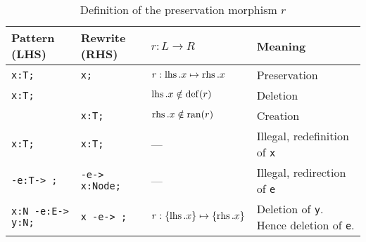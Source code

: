 \begin{table}[htbp]
\centering
\begin{tabularx}{\linewidth}{lllX}
  \textbf{Pattern (LHS)} & \textbf{Rewrite (RHS)} & \textbf{$r: L \longrightarrow R$} & \textbf{Meaning} \\ \hline
  \texttt{x:T;} & \texttt{x;}                 & $r:\operatorname{lhs}.x \mapsto \operatorname{rhs}.x$ & Preservation \\
  \texttt{x:T;} & \texttt{}                   & $\operatorname{lhs}.x \notin \operatorname{def}(r)$    & Deletion \\
  \texttt{} & \texttt{x:T;}                   & $\operatorname{rhs}.x \notin \operatorname{ran}(r)$    & Creation \\
  \texttt{x:T;} & \texttt{x:T;}               & --- & Illegal, redefinition of \texttt{x} \\
  \texttt{-e:T-> ;} & \texttt{-e-> x:Node;}    & --- & Illegal, redirection of  \texttt{e} \\
  \texttt{x:N -e:E-> y:N;} & \texttt{x -e-> ;} & $r:\{\operatorname{lhs}.x\} \mapsto \{\operatorname{rhs}.x\}$ & Deletion of \texttt{y}. Hence del\-etion of \texttt{e}. \\
\end{tabularx}
\caption{Definition of the preservation morphism $r$}
\label{rule:impldefinition}
\end{table}

